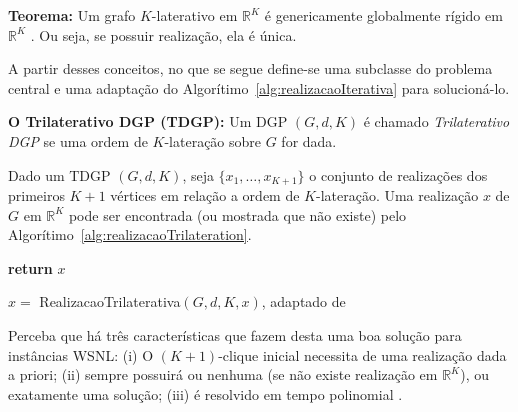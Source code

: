 \begin{center}
	\begin{minipage}{0.93 \linewidth}
		\textbf{Teorema:} Um grafo $K$-laterativo em $\mathbb{R}^K$ é genericamente globalmente rígido em $\mathbb{R}^K$ \cite{eren2004rigidity,carlileGDandAplications}. Ou seja, se possuir realização, ela é única.
	\end{minipage}
\end{center}

A partir desses conceitos, no que se segue define-se uma subclasse do problema central e uma adaptação do Algorítimo~\ref{alg:realizacaoIterativa} para solucioná-lo.
\begin{center}
	\begin{minipage}{0.93 \linewidth}
		\textbf{O Trilaterativo DGP (TDGP):} Um DGP $(G,d,K)$ é chamado \textit{Trilaterativo DGP} se uma ordem de $K$-lateração sobre $G$ for dada.
	\end{minipage}
\end{center}

Dado um TDGP $(G,d,K)$, seja $\{x_1, \dots,x_{K+1}\}$ o conjunto de realizações dos primeiros $K+1$ vértices em relação a ordem de $K$-lateração. Uma realização $x$ de $G$ em $\mathbb{R}^K$ pode ser encontrada (ou mostrada que não existe) pelo Algorítimo~\ref{alg:realizacaoTrilateration}.
\\

\begin{algorithm}[H]
	\label{alg:realizacaoTrilateration}
	\textbf{return} $x$\;
	\caption{$x =$ RealizacaoTrilaterativa$(G,d, K, x)$, adaptado de \cite{libertiEDG}}
\end{algorithm}
\vspace{0.4cm}

Perceba que há três características que fazem desta uma boa solução para instâncias WSNL: (i) O $(K+1)$-clique inicial necessita de uma realização dada a priori; (ii) sempre possuirá ou nenhuma (se não existe realização em $\mathbb{R}^K$), ou exatamente uma solução; (iii) é resolvido em tempo polinomial \cite{libertiEDG}.


